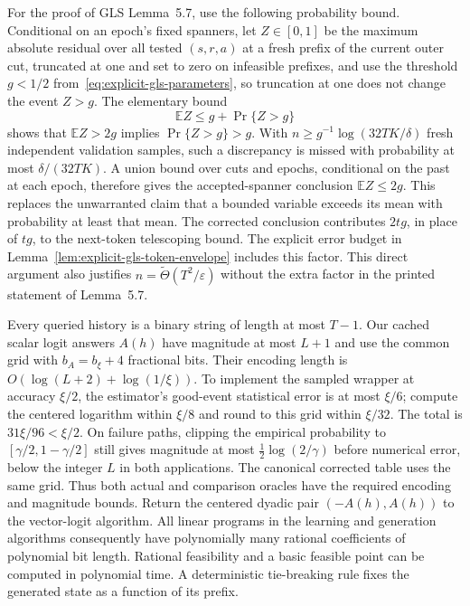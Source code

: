 \documentclass[11pt]{article}
\theoremstyle{definition}
\theoremstyle{remark}
\begin{document}
For the proof of GLS Lemma~5.7, use the following probability bound. Conditional on an epoch's fixed spanners, let $Z\in[0,1]$ be the maximum absolute residual over all tested $(s,r,a)$ at a fresh prefix of the current outer cut, truncated at one and set to zero on infeasible prefixes, and use the threshold $g<1/2$ from~\eqref{eq:explicit-gls-parameters}, so truncation at one does not change the event $Z>g$. The elementary bound
\[
\mathbb E Z\le g+\Pr\{Z>g\}
\]
shows that $\mathbb E Z>2g$ implies $\Pr\{Z>g\}>g$. With
$n\ge g^{-1}\log(32TK/\delta)$ fresh independent validation samples, such a discrepancy is missed with probability at most $\delta/(32TK)$. A union bound over cuts and epochs, conditional on the past at each epoch, therefore gives the accepted-spanner conclusion $\mathbb E Z\le2g$. This replaces the unwarranted claim that a bounded variable exceeds its mean with probability at least that mean. The corrected conclusion contributes $2tg$, in place of $tg$, to the next-token telescoping bound. The explicit error budget in Lemma~\ref{lem:explicit-gls-token-envelope} includes this factor. This direct argument also justifies $n=\widetilde\Theta(T^2/\varepsilon)$ without the extra factor in the printed statement of Lemma~5.7.

Every queried history is a binary string of length at most $T-1$. Our cached scalar logit answers $A(h)$ have magnitude at most $L+1$ and use the common grid with $b_A=b_\xi+4$ fractional bits. Their encoding length is $O(\log(L+2)+\log(1/\xi))$. To implement the sampled wrapper at accuracy $\xi/2$, the estimator's good-event statistical error is at most $\xi/6$; compute the centered logarithm within $\xi/8$ and round to this grid within $\xi/32$. The total is $31\xi/96<\xi/2$. On failure paths, clipping the empirical probability to $[\gamma/2,1-\gamma/2]$ still gives magnitude at most $\tfrac12\log(2/\gamma)$ before numerical error, below the integer $L$ in both applications. The canonical corrected table uses the same grid. Thus both actual and comparison oracles have the required encoding and magnitude bounds. Return the centered dyadic pair $(-A(h),A(h))$ to the vector-logit algorithm. All linear programs in the learning and generation algorithms consequently have polynomially many rational coefficients of polynomial bit length. Rational feasibility and a basic feasible point can be computed in polynomial time. A deterministic tie-breaking rule fixes the generated state as a function of its prefix.
\end{document}
